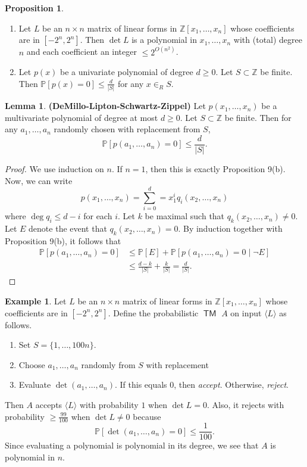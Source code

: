 \documentclass[10pt,letterpaper,cm]{nupset}
\theoremstyle{definition}
\newtheorem{exmp}{Example}
\newtheorem{prop}{Proposition}
\newtheorem{lemma}{Lemma}
\newcommand{\Z}{\mathbb Z}
\newcommand{\1}{\mathbf{1}}
\newcommand{\0}{\vec 0}
\DeclareMathOperator{\TM}{\mathsf{TM}}
\begin{document}
\begin{prop} $ $
\begin{enumerate}[label=(\alph*)]
\item Let $L$ be an $n\times n$ matrix of linear forms in $\Z[x_1, \ldots, x_n]$ whose coefficients are in $[{-}2^n, 2^n]$. Then $\det{L}$ is a polynomial in $x_1, \ldots, x_n$ with (total) degree $n$ and each coefficient an integer $\leq 2^{O(n^2)}$.
\item Let $p(x)$ be a univariate polynomial of degree $d \geq 0$. Let $S\subset \Z$ be finite. Then $\mathbb{P}[p(x) =0] \leq \frac{d}{|S|}$ for any $x\in_R S$.
\end{enumerate}
\end{prop}

\begin{lemma}{\textbf{(DeMillo-Lipton-Schwartz-Zippel)}}
Let $p(x_1, \ldots, x_n)$ be a multivariate polynomial of degree at most $d\geq 0$. Let $S \subset \Z$ be finite. Then for any $a_1, \ldots, a_n$ randomly chosen with replacement from $S$, $$\mathbb{P}[p(a_1, \ldots, a_n) =0] \leq \frac{d}{|S|}.$$
\end{lemma}
\begin{proof}
We use induction on $n$. If $n=1$, then this is exactly Proposition 9(b). Now, we can write $$p(x_1, \ldots, x_n) = \sum_{i=0}^d = x_1^i q_i(x_2, \ldots, x_n)$$ where $\deg{q_i} \leq d-i$ for each $i$. Let $k$ be maximal such that $q_k(x_2, \ldots, x_n) \ne 0$. Let $E$ denote the event that $q_k(x_2, \ldots, x_n) =0$. 
By induction together with Proposition 9(b), it follows that  
\begin{align*} \mathbb{P}[p(a_1, \ldots, a_n) =0] & \leq \mathbb{P}[E] + \mathbb{P}[p(a_1, \ldots, a_n) =0 \mid \neg{E}]
\\ & \leq \frac{d-k}{|S|} + \frac{k}{|S|} = \frac{d}{|S|}.
\end{align*}
\end{proof}

\begin{exmp}
Let $L$ be an $n \times n$ matrix of linear forms in $\Z[x_1, \ldots, x_n]$ whose coefficients are in $[{-}2^n, 2^n]$. Define the probabilistic $\TM$ $A$ on input $\langle L \rangle$ as follows. 
\begin{enumerate}
\item Set $S = \{1, \ldots, 100n\}$.
\item Choose $a_1, \ldots, a_n$ randomly from $S$ with replacement
\item Evaluate $\det(a_1, \ldots, a_n)$.  If this equals $0$, then \textit{accept}. Otherwise, \textit{reject}.
\end{enumerate}
Then $A$ accepts $\langle L \rangle$ with probability $1$ when $\det{L} = 0$. Also, it rejects with probability $\geq \frac{99}{100}$ when $\det{L} \ne 0$ because $$\mathbb{P}[\det(a_1, \ldots, a_n) =0] \leq \frac{1}{100}.$$ Since evaluating a polynomial is polynomial in its degree, we see that $A$ is polynomial in $n$.
\end{exmp}
\end{document}
